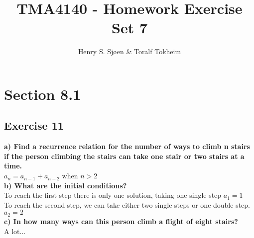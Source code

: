 \documentclass[12pt]{article}
\author{Henry S. Sjøen \& Toralf Tokheim}
\title{
  \textbf{TMA4140 - Homework Exercise Set 7}}
\begin{document}
    \maketitle
    \thispagestyle{empty}
    \pagebreak
    \tableofcontents
    \pagebreak

    \section{Section 8.1} 
    \subsection{Exercise 11}
    \textbf{a) Find a recurrence relation for the number of ways to climb n stairs if the person climbing the stairs can take one stair or two stairs at a time.}\\
    $ a_n=a_{n-1}+a_{n-2} $ when $n > 2$\\
    \textbf{b) What are the initial conditions?}\\
    To reach the first step there is only one solution, taking one single step $a_1=1$\\
    To reach the second step, we can take either two single steps or one double step. $a_2=2$\\
    \textbf{c) In how many ways can this person climb a flight of eight stairs?}\\
    A lot... 
\end{document}
